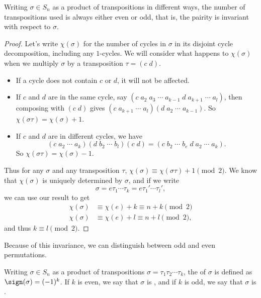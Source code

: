 \documentclass[a4paper]{scrartcl}
\begin{document}
\begin{theorem}
	Writing $\sigma \in S_n$ as a product of transpositions in different ways, the number of transpositions used is always either even or odd, that is, the pairity is invariant with respect to $\sigma$.
\end{theorem}
\begin{proof}
	Let's write $\chi(\sigma)$ for the number of cycles in $\sigma$ in its disjoint cycle decomposition, including any $1$-cycles. We will consider what happens to $\chi(\sigma)$ when we multiply $\sigma$ by a transposition $\tau = (c \; d)$.
	\begin{itemize}
		\item If a cycle does not contain $c$ or $d$, it will not be affected.
		\item If $c$ and $d$ are in the same cycle, say $(c\; a_2\; a_3\; \cdots \; a_{k - 1} \; d \; a_{k + 1}\; \cdots \; a_l)$, then composing with $(c\; d)$ gives $(c\; a_{k + 1}\; \cdots \; a_l)(d\; a_2\; \cdots\; a_{k - 1})$. So $\chi(\sigma \tau) = \chi(\sigma) + 1$.
		\item If $c$ and $d$ are in different cycles, we have
		$$
		(c\; a_2\; \cdots\; a_k)(d\; b_2\; \cdots\; b_l)(c\; d) = (c \; b_2 \; \cdots\; b_e \; d \; a_2 \; \cdots \; a_k).
		$$
		So $\chi(\sigma \tau) = \chi(\sigma) - 1$.
	\end{itemize}
	Thus for any $\sigma$ and any transposition $\tau$, $\chi(\sigma) \equiv \chi(\sigma \tau) + 1 \pmod{2}$.
	We know that $\chi(\sigma)$ is uniquely determined by $\sigma$, and if we write
	$$
	\sigma = e\tau_1 \cdots \tau_k = e\tau_1 ' \cdots \tau_l ',
	$$
	we can use our result to get
	\begin{align*}
		\chi(\sigma) &\equiv \chi(e) + k \equiv n + k \pmod{2} \\
		\chi(\sigma) &\equiv \chi(e) + l \equiv n + l \pmod{2},
	\end{align*}
	and thus $k \equiv l \pmod{2}$.
\end{proof}

Because of this invariance, we can distinguish between odd and even permutations.
\begin{definition}
	Writing $\sigma \in S_n$ as a product of transpositions $\sigma = \tau_1 \tau_2 \cdots \tau_k$, the  of $\sigma$ is defined as $\sign(\sigma) = (-1)^k$. If $k$ is even, we say that $\sigma$ is , and if $k$ is odd, we say that $\sigma$ is .
\end{definition} 
\end{document}
